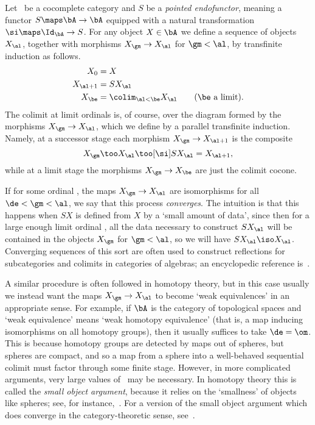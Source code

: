 \documentclass{amsart}
\begin{document}
\begin{eg}\label{thm:soa}
  Let \bA\ be a cocomplete category and $S$ be a \emph{pointed
    endofunctor}, meaning a functor $S\maps \bA\to\bA$ equipped with
  a natural transformation $\si\maps \Id_\bA \to S$.  For any object
  $X\in \bA$ we define a sequence of objects $X_\al$, together with
  morphisms $X_\gm\to X_\al$ for $\gm<\al$, by transfinite induction
  as follows.
  \begin{align*}
    X_0 &= X\\
    X_{\al+1} &= S X_\al\\
    X_{\be} &= \colim_{\al<\be} X_\al \qquad\text{($\be$ a limit)}.
  \end{align*}
  The colimit at limit ordinals is, of course, over the diagram
  formed by the morphisms $X_\gm\to X_\al$, which we define by a
  parallel transfinite induction.  Namely, at a successor stage each
  morphism $X_\gm \to X_{\al+1}$ is the composite
  \[X_\gm \too X_\al \too[\si] SX_\al= X_{\al+1},
  \]
  while at a limit stage the morphisms $X_\gm \to X_{\be}$ are just
  the colimit cocone.

  If for some ordinal \de, the maps $X_\gm\to X_\al$ are isomorphisms
  for all $\de<\gm<\al$, we say that this process \emph{converges}.
  The intuition is that this happens when $SX$ is defined from $X$ by
  a `small amount of data', since then for a large enough limit
  ordinal \al, all the data necessary to construct $SX_\al$ will be
  contained in the objects $X_\gm$ for $\gm<\al$, so we will have
  $SX_\al\iso X_\al$.  Converging sequences of this sort are often
  used to construct reflections for subcategories and colimits in
  categories of algebras; an encyclopedic reference
  is~\cite{kelly:transfinite,kelly:transfinite-add}.

  A similar procedure is often followed in homotopy theory, but in
  this case usually we instead want the maps $X_\gm\to X_\al$ to
  become `weak equivalences' in an appropriate sense.  For example, if
  $\bA$ is the category of topological spaces and `weak equivalence'
  means `weak homotopy equivalence' (that is, a map inducing
  isomorphisms on all homotopy groups), then it usually suffices to
  take $\de=\om$.  This is because homotopy groups are detected by
  maps out of spheres, but spheres are compact, and so a map from a
  sphere into a well-behaved sequential colimit must factor through
  some finite stage.  However, in more complicated arguments, very
  large values of \de\ may be necessary.  In homotopy theory this is
  called the \emph{small object argument}, because it relies on the
  `smallness' of objects like spheres; see, for
  instance,~\cite{hovey:modelcats}.  For a version of the small object
  argument which does converge in the category-theoretic sense,
  see~\cite{garner:soa}.
\end{eg}
\end{document}
